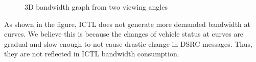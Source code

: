 \documentclass[12pt]{report}
\begin{document}
\begin{figure}[h]
  \caption{\label{fig:3d}3D bandwidth graph from two viewing angles}
\end{figure}

As shown in the figure, ICTL does not generate more demanded bandwidth at curves. We believe this is because the changes of vehicle status at curves are gradual and slow enough to not cause drastic change in DSRC messages. Thus, they are not reflected in ICTL bandwidth consumption.
\end{document}

